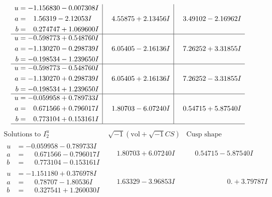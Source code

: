 \documentclass[1p]{elsarticle_modified}
\theoremstyle{definition}
\newcommand{\I}{\sqrt{-1}}
\begin{document}
$$\begin{array}{c|c|c}
\begin{aligned}
u &= -1.156830 - 0.007308 I \\
a &= \phantom{-}1.56319 - 2.12053 I \\
b &= \phantom{-}0.274747 + 1.069600 I\end{aligned}
 & \phantom{-}4.55875 + 2.13456 I & \phantom{-}3.49102 - 2.16962 I \\ \hline\begin{aligned}
u &= -0.598773 + 0.548760 I \\
a &= -1.130270 - 0.298739 I \\
b &= -0.198534 - 1.239650 I\end{aligned}
 & \phantom{-}6.05405 - 2.16136 I & \phantom{-}7.26252 + 3.31855 I \\ \hline\begin{aligned}
u &= -0.598773 - 0.548760 I \\
a &= -1.130270 + 0.298739 I \\
b &= -0.198534 + 1.239650 I\end{aligned}
 & \phantom{-}6.05405 + 2.16136 I & \phantom{-}7.26252 - 3.31855 I \\ \hline\begin{aligned}
u &= -0.059958 + 0.789733 I \\
a &= \phantom{-}0.671566 + 0.796017 I \\
b &= \phantom{-}0.773104 + 0.153161 I\end{aligned}
 & \phantom{-}1.80703 - 6.07240 I & \phantom{-}0.54715 + 5.87540 I\\
 \hline 
 \end{array}$$\newpage$$\begin{array}{c|c|c}  
\text{Solutions to }I^u_{2}& \I (\text{vol} + \sqrt{-1}CS) & \text{Cusp shape}\\
 \hline 
\begin{aligned}
u &= -0.059958 - 0.789733 I \\
a &= \phantom{-}0.671566 - 0.796017 I \\
b &= \phantom{-}0.773104 - 0.153161 I\end{aligned}
 & \phantom{-}1.80703 + 6.07240 I & \phantom{-}0.54715 - 5.87540 I \\ \hline\begin{aligned}
u &= -1.151180 + 0.376978 I \\
a &= \phantom{-}0.78707 - 1.80536 I \\
b &= \phantom{-}0.327541 + 1.260030 I\end{aligned}
 & \phantom{-}1.63329 - 3.96853 I & \phantom{-0.000000 -}0. + 3.79787 I \\ \hline\begin{aligned}

\end{aligned}
\end{array}$$
\end{document}
